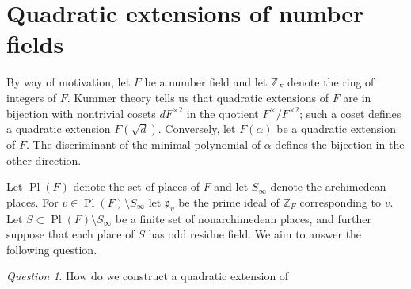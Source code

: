 \documentclass{dcthesis}
\newcommand{\ZZ}{\mathbb Z}
\DeclareMathOperator{\Pl}{Pl}
\numberwithin{equation}{section}
\theoremstyle{definition}
\theoremstyle{remark}
\newtheorem{question}[equation]{Question}
\begin{document}
{{  \section{Quadratic extensions of number fields}{
    \label{sec:numberfields}
    By way of motivation,
    let $F$ be a number field
    and let $\ZZ_F$ denote the ring of integers
    of $F$.
    Kummer theory tells us that quadratic
    extensions of $F$ are in bijection with
    nontrivial cosets $dF^{\times 2}$
    in the quotient
    $F^\times/F^{\times 2}$;
    such a coset defines a
    quadratic extension
    $F(\sqrt{d})$.
    Conversely,
    let $F(\alpha)$ be a quadratic extension of $F$.
    The discriminant of the minimal polynomial
    of $\alpha$ defines the bijection in the other
    direction.
    \par
    Let $\Pl(F)$ denote the set of places of $F$
    and let $S_\infty$ denote the archimedean
    places.
    For $v\in\Pl(F)\setminus S_\infty$
    let $\mathfrak{p}_v$
    be the prime ideal of $\ZZ_F$ corresponding
    to $v$.
    Let $S\subset\Pl(F)\setminus S_\infty$
    be a finite set of nonarchimedean places,
    and further suppose that each place of $S$
    has odd residue field.
    We aim to answer the following question.
    \begin{question}
      \label{ques:construct}
      How do we construct a
      quadratic extension of

\end{question}}}}
\end{document}
